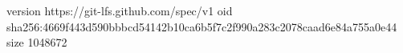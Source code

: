 version https://git-lfs.github.com/spec/v1
oid sha256:4669f443d590bbbcd54142b10ca6b5f7c2f990a283c2078caad6e84a755a0e44
size 1048672
